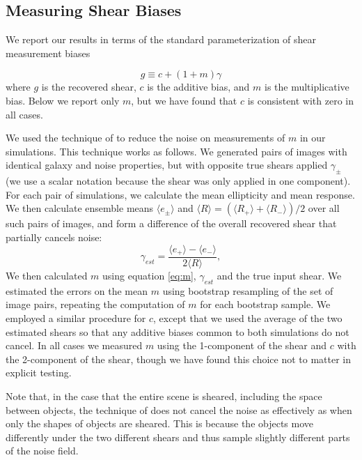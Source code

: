 \documentclass[iop, twocolappendix, appendixfloats, numberedappendix, apj]{hackemulateapj}
\begin{document}
\subsection{Measuring Shear Biases}

We report our results in terms of the standard parameterization of shear
measurement biases \citep[see, e.g.,][]{heymans2006}

\begin{equation} \label{eq:m}
g \equiv c + (1 + m)\gamma
\end{equation}
where $g$ is the recovered shear, $c$ is the additive bias, and $m$ is the
multiplicative bias. Below we report only $m$, but we have found that $c$ is
consistent with zero in all cases.

We used the technique of \citet{pujol2019} to reduce the noise on measurements
of $m$ in our simulations.  This technique works as follows. We generated pairs
of images with identical galaxy and noise properties, but with opposite true
shears applied $\gamma_{\pm}$ (we use a scalar notation because the shear
was only applied in one component).  For each pair of simulations, we calculate the mean
ellipticity and mean response.  We then calculate ensemble means $\langle e_\pm \rangle$
and $\langle R \rangle = ( \langle R_+ \rangle + \langle R_- \rangle)/2$ over all such
pairs of images, and form a difference of the overall recovered shear that
partially cancels noise:
\begin{equation}
    \gamma_{est} = \frac{ \langle e_+ \rangle - \langle e_- \rangle}{2 \langle R \rangle},
\end{equation}
We then calculated $m$ using equation \ref{eq:m}, $\gamma_{est}$ and the true
input shear.  We estimated the errors on the mean $m$ using bootstrap
resampling of the set of image pairs, repeating the computation of $m$ for each
bootstrap sample. We employed a similar procedure for $c$, except that we used
the average of the two estimated shears so that any additive biases common to
both simulations do not cancel. In all  cases we measured $m$ using the
1-component of the shear and $c$ with the 2-component of the shear, though we
have found this choice not to matter in explicit testing.

Note that, in the case that the entire scene is sheared, including the space
between objects, the technique of \citet{pujol2019} does not cancel the noise
as effectively as when only the shapes of objects are sheared.  This is because
the objects move differently under the two different shears and thus sample
slightly different parts of the noise field.
\end{document}
